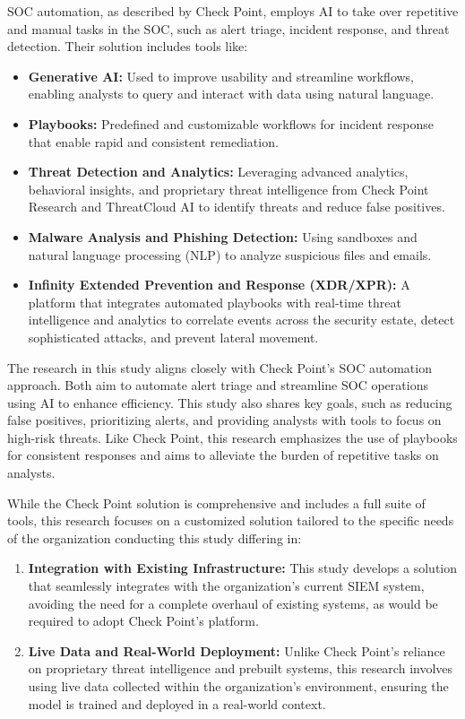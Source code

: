 SOC automation, as described by Check Point, employs AI to take over repetitive and manual tasks in the SOC, such as alert triage, incident response, and threat detection. Their solution includes tools like:
\begin{itemize}
    \item \textbf{Generative AI:} Used to improve usability and streamline workflows, enabling analysts to query and interact with data using natural language.
    \item \textbf{Playbooks:} Predefined and customizable workflows for incident response that enable rapid and consistent remediation.
    \item \textbf{Threat Detection and Analytics:} Leveraging advanced analytics, behavioral insights, and proprietary threat intelligence from Check Point Research and ThreatCloud AI to identify threats and reduce false positives.
    \item \textbf{Malware Analysis and Phishing Detection:} Using sandboxes and natural language processing (NLP) to analyze suspicious files and emails.
    \item \textbf{Infinity Extended Prevention and Response (XDR/XPR):} A platform that integrates automated playbooks with real-time threat intelligence and analytics to correlate events across the security estate, detect sophisticated attacks, and prevent lateral movement.
\end{itemize}

The research in this study aligns closely with Check Point’s SOC automation approach. 
Both aim to automate alert triage and streamline SOC operations using AI to enhance efficiency. 
This study also shares key goals, such as reducing false positives, prioritizing alerts, and providing analysts with tools to focus on high-risk threats. 
Like Check Point, this research emphasizes the use of playbooks for consistent responses and aims to alleviate the burden of repetitive tasks on analysts.

While the Check Point solution is comprehensive and includes a full suite of tools, this research focuses on a customized solution tailored to the specific needs of the organization conducting this study differing in:
\begin{enumerate}
    \item \textbf{Integration with Existing Infrastructure:} This study develops a solution that seamlessly integrates with the organization's current SIEM system, avoiding the need for a complete overhaul of existing systems, as would be required to adopt Check Point’s platform.
    \item \textbf{Live Data and Real-World Deployment:} Unlike Check Point’s reliance on proprietary threat intelligence and prebuilt systems, this research involves using live data collected within the organization's environment, ensuring the model is trained and deployed in a real-world context.
\end{enumerate}

